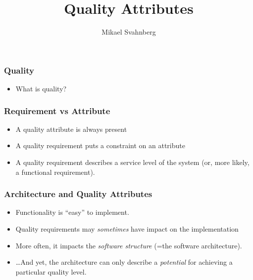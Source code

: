 \documentclass[10pt]{beamer}
\title[]{Quality Attributes}
\author[Mikael Svahnberg]{Mikael Svahnberg\inst{1}}
\institute[BTH] %
{
  \inst{1}%
 Mikael.Svahnberg@bth.se\\
 School of Computing\\
 Blekinge Institute of Technology%
}
\begin{document}
\begin{frame}
  \titlepage
\end{frame}



\begin{frame}[t]
\frametitle{Quality}

\begin{itemize}
\item What is quality?
\end{itemize}

\end{frame}

\begin{frame}[t]
\frametitle{Requirement vs Attribute}
\begin{itemize}
\item A quality attribute is always present
\item A quality requirement puts a constraint on an attribute
\item A quality requirement describes a service level of the system (or, more likely, a functional requirement).
\end{itemize}
\end{frame}

\begin{frame}[t]
\frametitle{Architecture and Quality Attributes}
\begin{itemize}
\item Functionality is ``easy'' to implement.
\item Quality requirements may \emph{sometimes} have impact on the implementation
\item More often, it impacts the \emph{software structure} (=the software architecture).
\item \ldots And yet, the architecture can only describe a \emph{potential} for achieving a particular quality level.
\end{itemize}
\end{frame}
\end{document}

